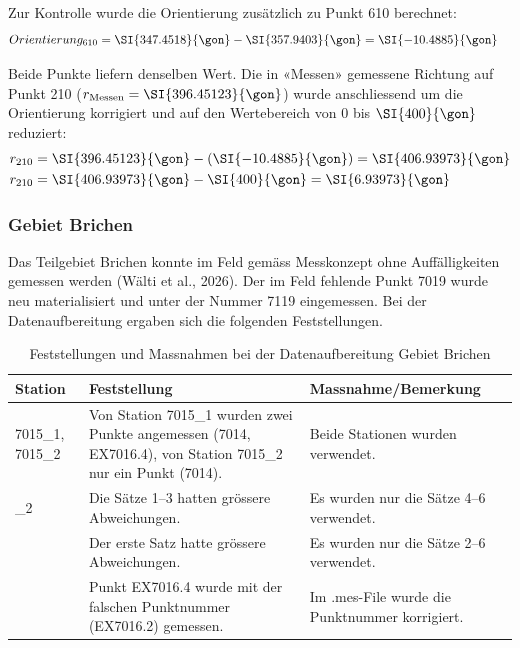 Zur Kontrolle wurde die Orientierung zusätzlich zu Punkt 610 berechnet:
\begin{align*}
    Orientierung_{610} &= \SI{347.4518}{\gon} - \SI{357.9403}{\gon} = \SI{-10.4885}{\gon}
\end{align*}

Beide Punkte liefern denselben Wert. Die in «Messen» gemessene Richtung auf Punkt 210
($r_{\text{Messen}} = \SI{396.45123}{\gon}$) wurde anschliessend um die Orientierung
korrigiert und auf den Wertebereich von $0$ bis $\SI{400}{\gon}$ reduziert:
\begin{align*}
    r_{210} &= \SI{396.45123}{\gon} - (\SI{-10.4885}{\gon}) = \SI{406.93973}{\gon} \\
    r_{210} &= \SI{406.93973}{\gon} - \SI{400}{\gon} = \SI{6.93973}{\gon}
\end{align*}

\subsubsection{Gebiet Brichen}
\label{sec:gebiet-brichen}
Das Teilgebiet Brichen konnte im Feld gemäss Messkonzept ohne
Auffälligkeiten gemessen werden (Wälti et al., 2026).
Der im Feld fehlende Punkt 7019 wurde neu materialisiert und unter der
Nummer 7119 eingemessen. Bei der Datenaufbereitung ergaben sich die
folgenden Feststellungen.

\begin{table}[H]
    \centering
    \begin{tabularx}{\textwidth}{p{2.2cm} X X}
        \toprule
        Station & Feststellung & Massnahme/Bemerkung \\
        \midrule
        7015\_1, 7015\_2 & Von Station 7015\_1 wurden zwei Punkte
        angemessen (7014, EX7016.4), von Station 7015\_2 nur ein Punkt
        (7014). & Beide Stationen wurden verwendet. \\
        \addlinespace
        7016\_2 & Die Sätze 1--3 hatten grössere Abweichungen.
        & Es wurden nur die Sätze 4--6 verwendet. \\
        \addlinespace
        7119 & Der erste Satz hatte grössere Abweichungen. &
        Es wurden nur die Sätze 2--6 verwendet. \\
        \addlinespace
        7023 & Punkt EX7016.4 wurde mit der falschen Punktnummer
        (EX7016.2) gemessen. & Im .mes-File wurde die Punktnummer
        korrigiert. \\
        \bottomrule
    \end{tabularx}
    \caption{Feststellungen und Massnahmen bei der Datenaufbereitung
    Gebiet Brichen}
    \label{tab:feststellungen-brichen}
\end{table}

